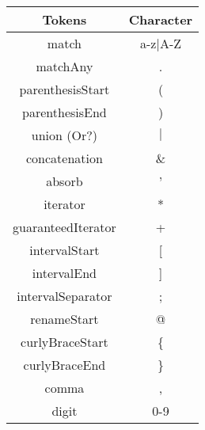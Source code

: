 \begin{tabular}{|c|c|}
    \hline
    \textbf{Tokens} & \textbf{Character}\\
    \hline
    match & a-z$\mid$A-Z\\
    \hline
    matchAny & .\\
    \hline
    parenthesisStart & (\\
    \hline
    parenthesisEnd & )\\
    \hline
    union (Or?) & $\mid$\\
    \hline
    concatenation & \&\\
    \hline
    absorb & '\\
    \hline
    iterator & *\\
    \hline
    guaranteedIterator & +\\
    \hline
    intervalStart & [\\
    \hline
    intervalEnd & ]\\
    \hline
    intervalSeparator & ;\\
    \hline
    renameStart & @\\
    \hline
    curlyBraceStart & \{\\
    \hline
    curlyBraceEnd & \}\\
    \hline
    comma & ,\\
    \hline
    digit & 0-9\\
    \hline
\end{tabular}